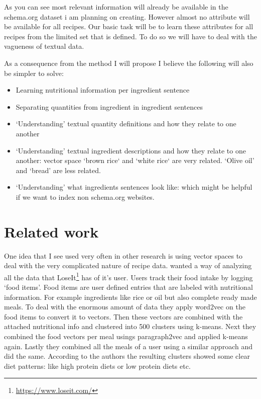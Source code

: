 \documentclass[a4paper]{scrartcl}
\begin{document}
As you can see most relevant information will already be available in the schema.org dataset i am planning on creating. However almost no attribute will be available for all recipes. Our basic task will be to learn these attributes for all recipes from the limited set that is defined. To do so we will have to deal with the vagueness of textual data.

As a consequence from the method I will propose I believe the following will also be simpler to solve:
\begin{itemize}
\item Learning nutritional information per ingredient sentence
\item Separating quantities from ingredient in ingredient sentences
\item `Understanding' textual quantity definitions and how they relate to one another
\item `Understanding' textual ingredient descriptions and how they relate to one another: vector space `brown rice` and `white rice` are very related. `Olive oil' and `bread' are less related. 
\item `Understanding' what ingredients sentences look like: which might be helpful if we want to index non schema.org websites. 
\end{itemize}
\section{Related work}
One idea that I see used very often in other research is using vector spaces to deal with the very complicated nature of recipe data.   
 wanted a way of analyzing all the data that LoseIt\footnote{\url{https://www.loseit.com/}} has of it's user. Users track their food intake by logging `food items'. Food items are user defined entries that are labeled with nutritional information. For example ingredients like rice or oil but also complete ready made meals. To deal with the enormous amount of data they apply word2vec on the food items to convert it to vectors. Then these vectors are combined with the attached nutritional info and clustered into 500 clusters using k-means. Next they combined the food vectors per meal usings paragraph2vec\cite{le2014distributed} and applied k-means again. Lastly they combined all the meals of a user using a similar approach and did the same. According to the authors the resulting clusters showed some clear diet patterns: like high protein diets or low protein diets etc.
\end{document}
